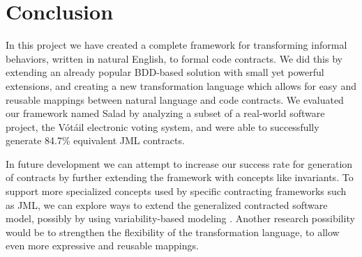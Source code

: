 \section{Conclusion}
\label{sec:Conclusion}
In this project we have created a complete framework for transforming informal behaviors, written in natural English, to formal code contracts.
We did this by extending an already popular BDD-based solution with small yet powerful extensions, and creating a new transformation language which
allows for easy and reusable mappings between natural language and code contracts.
We evaluated our framework named Salad by analyzing a subset of a real-world software project, the V\'{o}t\'{a}il electronic voting system, and were able to successfully generate
84.7\% equivalent JML contracts.

In future development we can attempt to increase our success rate for generation of contracts by further extending the framework with concepts like invariants.
To support more specialized concepts used by specific contracting frameworks such as JML,
we can explore ways to extend the generalized contracted software model, possibly by using variability-based modeling \cite{czarnecki2012cool}.
Another research possibility would be to strengthen the flexibility of the transformation language, to allow even more expressive and reusable
mappings.
